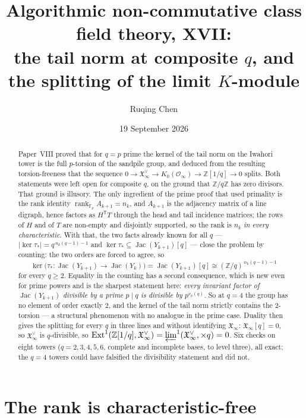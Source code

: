 \documentclass[11pt]{amsart}
\title[Algorithmic non-commutative class field theory, XVII]
{Algorithmic non-commutative class field theory, XVII:\\
the tail norm at composite $q$, and the splitting of the limit $K$-module}
\author{Ruqing Chen}
\date{19 September 2026}
\numberwithin{equation}{section}
\theoremstyle{definition}
\theoremstyle{remark}
\newcommand{\Z}{\mathbb{Z}}
\newcommand{\F}{\mathbb{F}}
\newcommand{\cO}{\mathcal{O}}
\newcommand{\XX}{\mathfrak{X}_\infty}
\newcommand{\Jac}{\operatorname{Jac}}
\newcommand{\rank}{\operatorname{rank}}
\newcommand{\ta}{\tau_*}
\begin{document}
\begin{abstract}
Paper~VIII proved that for $q=p$ prime the kernel of the tail norm on the Iwahori tower is
the full $p$-torsion of the sandpile group, and deduced from the resulting torsion-freeness
that the sequence $0\to\XX^\vee\to K_0(\cO_\infty)\to\Z[1/q]\to0$ splits. Both statements
were left open for composite $q$, on the ground that $\Z/q\Z$ has zero divisors. That
ground is illusory. The only ingredient of the prime proof that used primality is the rank
identity $\rank_{\F_p}A_{k+1}=n_k$, and $A_{k+1}$ is the adjacency matrix of a line
digraph, hence factors as $H^{\mathsf T}T$ through the head and tail incidence matrices;
the rows of $H$ and of $T$ are non-empty and disjointly supported, so the rank is $n_k$
\emph{in every characteristic}. With that, the two facts already known for all $q$ ---
$|\ker\ta|=q^{\,n_k(q-1)-1}$ and $\ker\ta\subseteq\Jac(Y_{k+1})[q]$ --- close the problem
by counting: the two orders are forced to agree, so
\[
\ker\bigl(\ta\colon\Jac(Y_{k+1})\to\Jac(Y_k)\bigr)=\Jac(Y_{k+1})[q]\cong(\Z/q)^{\,n_k(q-1)-1}
\]
for every $q\ge2$. Equality in the counting has a second consequence, which is new even
for prime powers and is the sharpest statement here: \emph{every invariant factor of
$\Jac(Y_{k+1})$ divisible by a prime $p\mid q$ is divisible by $p^{v_p(q)}$}. So at
$q=4$ the group has no element of order exactly $2$, and the kernel of the tail norm
strictly contains the $2$-torsion --- a structural phenomenon with no analogue in the
prime case. Duality then gives the splitting for every $q$ in three lines and without
identifying $\XX$: $\XX[q]=0$, so $\XX^\vee$ is $q$-divisible, so
$\mathrm{Ext}^1(\Z[1/q],\XX^\vee)=\varprojlim^1(\XX^\vee,\times q)=0$. Six checks on
eight towers ($q=2,3,4,5,6$, complete and incomplete bases, to level three), all exact;
the $q=4$ towers could have falsified the divisibility statement and did not.
\end{abstract}

\maketitle

\section{The rank is characteristic-free}\label{sec:rank}
\end{document}
